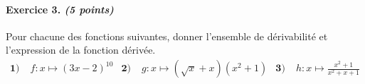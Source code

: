 \documentclass[11pt]{article}
\begin{document}
\paragraph{Exercice 3. \emph{(5 points)}} Pour chacune des fonctions suivantes, donner l'ensemble
de dérivabilité et l'expression de la fonction dérivée.
\begin{align*}
  \textbf{1)}\;& f:x\mapsto (3x-2)^{10} &
  \textbf{2)}\;& g:x\mapsto (\sqrt x+x)(x^2+1) &
  \textbf{3)}\;& h:x\mapsto \frac{x^2+1}{x^2+x+1}
\end{align*}
\end{document}

